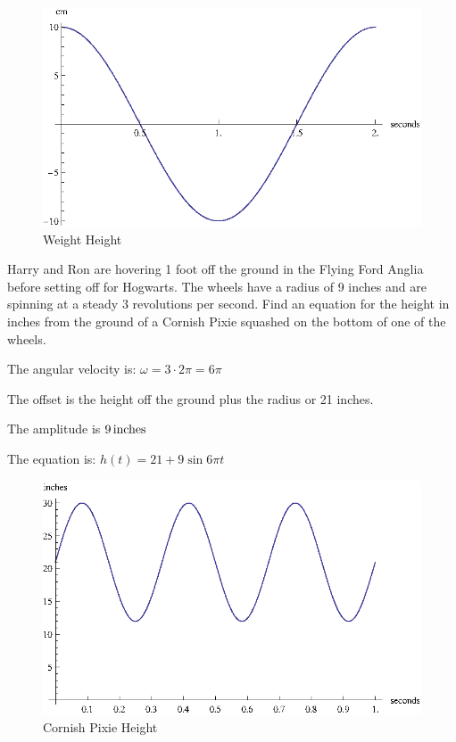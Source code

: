 \documentclass[fleqn,addpoints]{exam}
\begin{document}
\begin{questions}
\begin{solution}
        \begin{figure}[H]
          \centering
          \includegraphics[scale=1.0]{spring.eps}
          \caption{Weight Height}
        \end{figure}

      \end{solution}

    \question[10] 
      Harry and Ron are hovering 1 foot off the ground in the Flying Ford Anglia before setting off for Hogwarts.  The
      wheels have a radius of 9 inches and are spinning at a steady 3 revolutions per second.  Find an equation for the
      height in inches from the ground of a Cornish Pixie squashed on the bottom of one of the wheels.

      \begin{solution}
        \begin{itemize*}
          \item The angular velocity is: $\omega = 3 \cdot 2 \pi = 6 \pi$
          \item The offset is the height off the ground plus the radius or 21 inches.
          \item The amplitude is $\unit[9]{inches}$
        \end{itemize*}

        The equation is: $h(t) = 21 + 9 \sin 6 \pi t$ 

        \begin{figure}[H]
          \centering
          \includegraphics[scale=1.0]{graph5.eps}
          \caption{Cornish Pixie Height}
        \end{figure}


\end{solution}
\end{questions}
\end{document}
